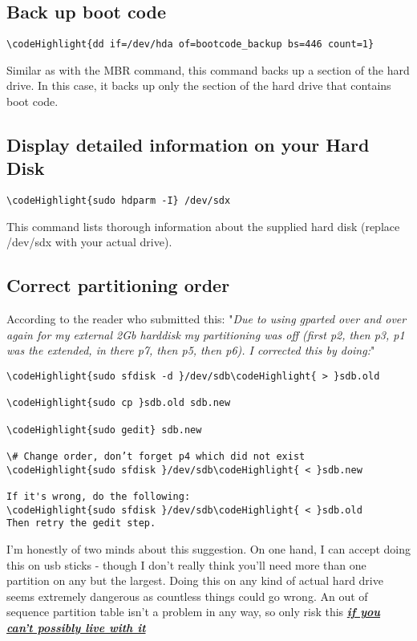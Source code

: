 \documentclass[12pt,a4paper]{article}
\begin{document}
\subsection{Back up boot code}
\begin{Verbatim}[commandchars=\\\{\}]
\codeHighlight{dd if=/dev/hda of=bootcode_backup bs=446 count=1}
\end{Verbatim}
Similar as with the MBR command, this command backs up a section of the hard drive. In this case, it backs up only the section of the hard drive that contains boot code.

\subsection{Display detailed information on your Hard Disk}
\begin{Verbatim}[commandchars=\\\{\}]
\codeHighlight{sudo hdparm -I} /dev/sdx
\end{Verbatim}
This command lists thorough information about the supplied hard disk (replace /dev/sdx with your actual drive).

\subsection{Correct partitioning order}
According to the reader who submitted this:
"\textit{Due to using gparted over and over again for my external 2Gb harddisk my partitioning was off (first p2, then p3, p1 was the extended, in there p7, then p5, then p6).
I corrected this by doing:}"
\begin{Verbatim}[commandchars=\\\{\}]
\codeHighlight{sudo sfdisk -d }/dev/sdb\codeHighlight{ > }sdb.old

\codeHighlight{sudo cp }sdb.old sdb.new

\codeHighlight{sudo gedit} sdb.new 

\# Change order, don’t forget p4 which did not exist
\codeHighlight{sudo sfdisk }/dev/sdb\codeHighlight{ < }sdb.new

If it's wrong, do the following:
\codeHighlight{sudo sfdisk }/dev/sdb\codeHighlight{ < }sdb.old
Then retry the gedit step.
\end{Verbatim}
I'm honestly of two minds about this suggestion.  On one hand, I can accept doing this on usb sticks - though I don't really think you'll need more than one partition on any but the largest.  Doing this on any kind of actual hard drive seems extremely dangerous as countless things could go wrong. An out of sequence partition table isn't a problem in any way, so only risk this \underline{\textbf{\textit{if you can't possibly live with it}}}
\end{document}
